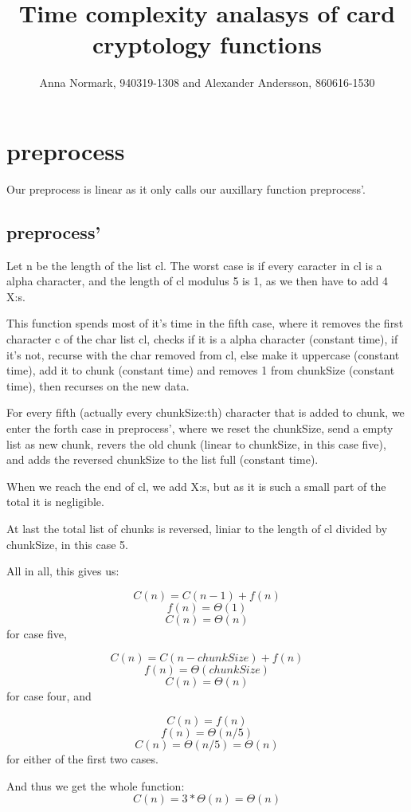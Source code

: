 \documentclass[12pt, a4paper]{article}
\title{Time complexity analasys of card cryptology functions}
\author{Anna Normark, 940319-1308 and Alexander Andersson, 860616-1530}
\begin{document}
\maketitle



\section{preprocess}
Our preprocess is linear as it only calls our auxillary function preprocess'.

\subsection{preprocess'}
Let n be the length of the list cl. The worst case is if every caracter in cl is a alpha character, and the length of cl modulus 5 is 1, as we then have to add 4 X:s.

This function spends most of it's time in the fifth case, where it removes the first character c of the char list cl, checks if it is a alpha character (constant time), if it's not, recurse with the char removed from cl, else make it uppercase (constant time), add it to chunk (constant time) and removes 1 from chunkSize (constant time), then recurses on the new data.

For every fifth (actually every chunkSize:th) character that is added to chunk, we enter the forth case in preprocess', where we reset the chunkSize, send a empty list as new chunk, revers the old chunk (linear to chunkSize, in this case five), and adds the reversed chunkSize to the list full (constant time).

When we reach the end of cl, we add X:s, but as it is such a small part of the total it is negligible.

At last the total list of chunks is reversed, liniar to the length of cl divided by chunkSize, in this case 5.

All in all, this gives us:

$$C(n) = C(n-1) + f(n)$$
$$f(n) = \Theta(1)$$
$$C(n) = \Theta(n)$$ for case five,


$$C(n) = C(n - chunkSize) + f(n)$$
$$f(n) = \Theta(chunkSize)$$
$$C(n) = \Theta(n)$$ for case four, and

$$C(n) = f(n)$$
$$f(n) = \Theta(n/5)$$
$$C(n) = \Theta(n/5) = \Theta(n)$$ for either of the first two cases.

And thus we get the whole function:
$$C(n) = 3 * \Theta(n) = \Theta(n)$$
\end{document}
